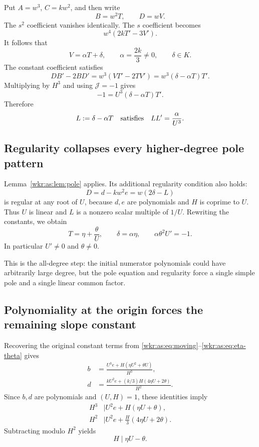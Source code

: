 \documentclass[11pt,a4paper]{article}
\numberwithin{equation}{section}
\theoremstyle{definition}
\theoremstyle{remark}
\newcommand{\J}{\mathcal{J}}
\begin{document}
Put $A=w^3$, $C=kw^2$, and then write
\[
B=w^2T,\qquad D=wV.
\]
The $s^2$ coefficient vanishes identically. The $s$ coefficient becomes
\[
w^4(2kT'-3V').
\]
It follows that
\begin{equation}\label{wkr:as:eq:VT}
V=\alpha T+\delta,\qquad \alpha=\frac{2k}{3}\ne0,\qquad \delta\in K.
\end{equation}
The constant coefficient satisfies
\[
DB'-2BD'=w^3(VT'-2TV')=w^3(\delta-\alpha T)T'.
\]
Multiplying by $H^3$ and using $\J=-1$ gives
\begin{equation}\label{wkr:as:eq:TU}
-1=U^3(\delta-\alpha T)T'.
\end{equation}
Therefore
\[
L:=\delta-\alpha T
\quad\hbox{satisfies}\quad
LL'=\frac{\alpha}{U^3}.
\]

\subsection{Regularity collapses every higher-degree pole pattern}

Lemma~\ref{wkr:as:lem:pole} applies. Its additional regularity condition
also holds:
\[
D=d-kw^2e=w(2\delta-L)
\]
is regular at any root of $U$, because $d,e$ are polynomials and $H$ is
coprime to $U$. Thus $U$ is linear and $L$ is a nonzero scalar multiple
of $1/U$. Rewriting the constants, we obtain
\begin{equation}\label{wkr:as:eq:eta-theta}
T=\eta+\frac{\theta}{U},\qquad
\delta=\alpha\eta,\qquad
\alpha\theta^2U'=-1.
\end{equation}
In particular $U'\ne0$ and $\theta\ne0$.

This is the all-degree step: the initial numerator polynomials could have
arbitrarily large degree, but the pole equation and regularity force a
single simple pole and a single linear common factor.

\subsection{Polynomiality at the origin forces the remaining slope constant}

Recovering the original constant terms from
\eqref{wkr:as:eq:moving}--\eqref{wkr:as:eq:eta-theta} gives
\begin{align}
b&=\frac{U^3e+H(\eta U^2+\theta U)}{H^3},\label{wkr:as:eq:breconstruct}\\
d&=\frac{kU^2e+(k/3)H(4\eta U+2\theta)}{H^2}.\label{wkr:as:eq:dreconstruct}
\end{align}
Since $b,d$ are polynomials and $(U,H)=1$, these identities imply
\begin{align*}
H^3&\mid U^2e+H(\eta U+\theta),\\
H^2&\mid U^2e+\frac H3(4\eta U+2\theta).
\end{align*}
Subtracting modulo $H^2$ yields
\begin{equation}\label{wkr:as:eq:Hdivides}
H\mid\eta U-\theta.
\end{equation}
\end{document}

